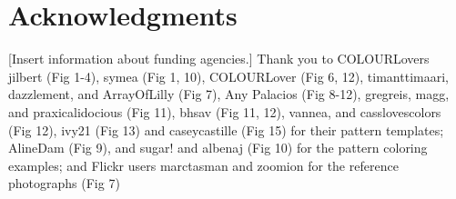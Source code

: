 \section*{Acknowledgments}

[Insert information about funding agencies.] Thank you to COLOURLovers jilbert (Fig 1-4), symea (Fig 1, 10), COLOURLover (Fig 6, 12), timanttimaari, dazzlement, and ArrayOfLilly (Fig 7), Any Palacios (Fig 8-12), gregreis, magg, and praxicalidocious (Fig 11), bhsav (Fig 11, 12), vannea, and casslovescolors (Fig 12), ivy21 (Fig 13) and caseycastille (Fig 15) for their pattern templates; AlineDam (Fig 9), and sugar! and albenaj (Fig 10) for the pattern coloring examples; and Flickr users marctasman and zoomion for the reference photographs (Fig 7)       
